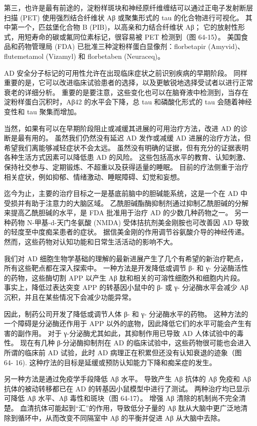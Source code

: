第三，也许是最有前途的，淀粉样斑块和神经原纤维缠结可以通过正电子发射断层扫描 (PET) 使用强烈结合纤维状 Aβ 或聚集形式的 tau 的化合物进行可视化。 其中第一个，匹兹堡化合物 B (PIB)，以高亲和力结合纤维状 Aβ； 它的放射性形式，用短寿命的碳或氟同位素标记，很容易被 PET 检测到（图 64-15）。 美国食品和药物管理局 (FDA) 已批准三种淀粉样蛋白显像剂：florbetapir (Amyvid)、flutemetamol (Vizamyl) 和 florbetaben (Neuraceq)。

AD 安全分子标记的可用性允许在出现临床症状之前识别疾病的早期阶段。 同样重要的是，它可以改进临床试验患者的选择，以及更敏锐地选择受试者以进行正常衰老的详细分析。 重要的是要注意，这些变化也可以在脑脊液中检测到，当存在淀粉样蛋白沉积时，Aβ42 的水平会下降，总 tau 和磷酸化形式的 tau 会随着神经变性和 tau 聚集而增加。

当然，如果有可以在早期阶段阻止或减缓其进展的可用治疗方法，改进 AD 的诊断是最有用的。 虽然我们仍然没有延迟 AD 发作或减缓 AD 进展的治疗方法，但希望我们离能够减轻症状不会太远。 虽然没有明确的证据，但有充分的证据表明各种生活方式因素可以降低患 AD 的风险。 这些包括高水平的教育、认知刺激、保持社交参与、定期锻炼、不超重以及获得适量的睡眠。 目前的疗法侧重于治疗相关症状，例如抑郁、情绪激动、睡眠障碍、幻觉和妄想。

迄今为止，主要的治疗目标之一是基底前脑中的胆碱能系统，这是一个在 AD 中受损并有助于注意力的大脑区域。 乙酰胆碱酯酶抑制剂通过抑制乙酰胆碱的分解来提高乙酰胆碱的水平，是 FDA 批准用于治疗 AD 的少数几种药物之一。 另一种药物 N-甲基-d-天门冬氨酸 (NMDA) 受体拮抗剂美金刚胺也可改善因 AD 导致的轻度至中度痴呆患者的症状。 据信美金刚的作用调节谷氨酸介导的神经传递。 然而，这些药物对认知功能和日常生活活动的影响不大。

我们对 AD 细胞生物学基础的理解的最新进展产生了几个有希望的新治疗靶点，所有这些靶点都在深入探索中。 一种方法是开发降低或调节 β- 和 γ- 分泌酶活性的药物，这些酶切割 APP 以产生 Aβ 肽和相关的可溶性细胞外和细胞内片段。 事实上，降低过表达突变 APP 的转基因小鼠中的 β- 或 γ- 分泌酶水平会减少 Aβ 沉积，并且在某些情况下会减少功能异常。

因此，制药公司开发了降低或调节人体 β- 和 γ- 分泌酶水平的药物。 这种方法的一个障碍是分泌酶还作用于 APP 以外的底物，因此降低它们的水平可能会产生有害的副作用。 对于 γ-分泌酶尤其如此，其抑制作用已导致 AD 人体试验中的毒性。 现在有几种 β-分泌酶抑制剂在 AD 的临床试验中，这些药物很可能也会进入所谓的临床前 AD 试验，此时 AD 病理正在积累但还没有认知衰退的迹象（图 64- 16). 这种疗法的目标是延缓或预防认知能力下降和痴呆症的发生。

另一种方法是通过免疫学手段降低 Aβ 水平。 导致产生 Aβ 抗体的 Aβ 免疫和 Aβ 抗体的被动转移都已在 AD 的转基因小鼠模型中进行了测试。 两种治疗均已显示可降低 Aβ 水平、Aβ 毒性和斑块（图 64-17）。 增强 Aβ 清除的机制尚不完全清楚。 血清抗体可能起到“汇”的作用，导致低分子量的 Aβ 肽从大脑中更广泛地清除到循环中，从而改变不同隔室中 Aβ 的平衡并促进 Aβ 从大脑中去除。


